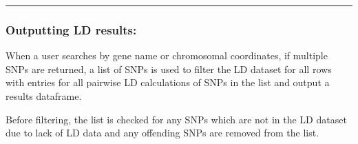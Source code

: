 \documentclass[12pt,a4paper]{article}
\begin{document}
{}

{}

\begin{center}\rule{0.5\linewidth}{0.5pt}\end{center}

\hypertarget{h.czvflz3vh9cw}{%
\subsubsection{\texorpdfstring{{}}{}}\label{h.czvflz3vh9cw}}

\hypertarget{h.2wm5ip20i7c1}{%
\subsubsection{\texorpdfstring{{Outputting LD
results:}}{Outputting LD results:}}\label{h.2wm5ip20i7c1}}

{When a user searches by gene name or chromosomal coordinates, if
multiple SNPs are returned, a list of SNPs is used to filter the LD
dataset for all rows with entries for all pairwise LD calculations of
SNPs in the list and output a results dataframe.}

{}

{Before filtering, the list is checked for any SNPs which are not in the
LD dataset due to lack of LD data and any offending SNPs are removed
from the list. }

\protect\hypertarget{t.2485981c42700898c52a2bdcff2edf8fc12f566c}{}{}\protect\hypertarget{t.11}{}{}
\end{document}
